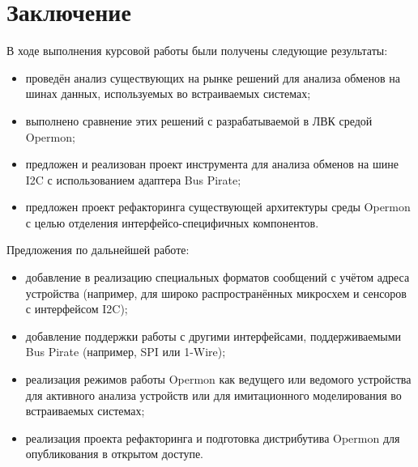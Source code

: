 \section{Заключение}

В ходе выполнения курсовой работы были получены следующие результаты:

\begin{itemize}
 \item проведён анализ существующих на рынке решений для анализа обменов на шинах данных, используемых во встраиваемых системах;
 \item выполнено сравнение этих решений с разрабатываемой в ЛВК средой Opermon;
 \item предложен и реализован проект инструмента для анализа обменов на шине I2C с использованием адаптера Bus Pirate;
 \item предложен проект рефакторинга существующей архитектуры среды Opermon с целью отделения интерфейсо-специфичных компонентов.
\end{itemize}

Предложения по дальнейшей работе:

\begin{itemize}
 \item добавление в реализацию специальных форматов сообщений с учётом адреса устройства (например, для широко распространённых микросхем и сенсоров с интерфейсом I2C);
 \item добавление поддержки работы с другими интерфейсами, поддерживаемыми Bus Pirate (например, SPI или 1-Wire);
 \item реализация режимов работы Opermon как ведущего или ведомого устройства для активного анализа устройств или для имитационного моделирования во встраиваемых системах;
 \item реализация проекта рефакторинга и подготовка дистрибутива Opermon для опубликования в открытом доступе.
\end{itemize}

